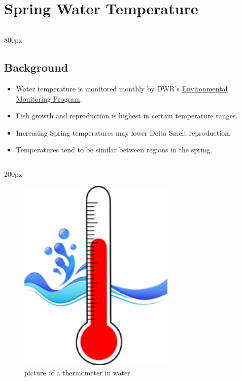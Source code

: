 \documentclass[
]{book}
\providecommand{\tightlist}{%
  \setlength{\itemsep}{0pt}\setlength{\parskip}{0pt}}
\begin{document}
\hypertarget{spring-water-temperature}{%
\section{Spring Water Temperature}\label{spring-water-temperature}}

\begin{column}{800px\textwidth}
\hypertarget{background-1}{%
\subsection{Background}\label{background-1}}

\begin{itemize}
\tightlist
\item
  Water temperature is monitored monthly by DWR's \href{https://emp.baydeltalive.com/wiki/12297}{Environmental Monitoring Program}.
\item
  Fish growth and reproduction is highest in certain temperature ranges.
\item
  Increasing Spring temperatures may lower Delta Smelt reproduction.
\item
  Temperatures tend to be similar between regions in the spring.
\end{itemize}
\end{column}

\begin{column}{200px\textwidth}
\begin{figure}

{\centering \includegraphics[width=2.94in]{figures/thermometer} 

}

\caption{picture of a thermometer in water}\label{fig:unnamed-chunk-12}
\end{figure}
\end{column}
\end{document}
